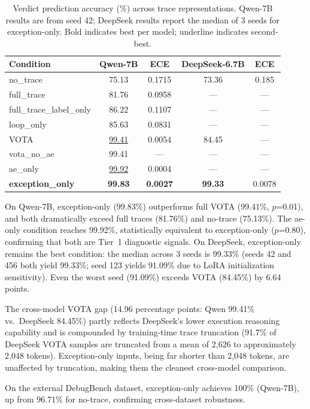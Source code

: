 \documentclass[11pt]{article}
\begin{document}
\begin{table}[t]
\centering
\caption{Verdict prediction accuracy (\%) across trace representations. Qwen-7B results are from seed 42; DeepSeek results report the median of 3 seeds for exception-only. Bold indicates best per model; underline indicates second-best.}
\label{tab:main}
\small
\begin{tabular}{lcccc}
\toprule
\textbf{Condition} & \textbf{Qwen-7B} & \textbf{ECE} & \textbf{DeepSeek-6.7B} & \textbf{ECE} \\
\midrule
no\_trace & 75.13 & 0.1715 & 73.36 & 0.185 \\
full\_trace & 81.76 & 0.0958 & --- & --- \\
full\_trace\_label\_only & 86.22 & 0.1107 & --- & --- \\
loop\_only & 85.63 & 0.0831 & --- & --- \\
VOTA & \underline{99.41} & 0.0054 & 84.45 & --- \\
vota\_no\_ae & 99.41 & --- & --- & --- \\
ae\_only & \underline{99.92} & 0.0004 & --- & --- \\
\textbf{exception\_only} & \textbf{99.83} & \textbf{0.0027} & \textbf{99.33} & 0.0078 \\
\bottomrule
\end{tabular}
\end{table}

On Qwen-7B, exception-only (99.83\%) outperforms full VOTA (99.41\%, $p$=0.01), and both dramatically exceed full traces (81.76\%) and no-trace (75.13\%). The ae-only condition reaches 99.92\%, statistically equivalent to exception-only ($p$=0.80), confirming that both are Tier~1 diagnostic signals. On DeepSeek, exception-only remains the best condition: the median across 3 seeds is 99.33\% (seeds 42 and 456 both yield 99.33\%; seed 123 yields 91.09\% due to LoRA initialization sensitivity). Even the worst seed (91.09\%) exceeds VOTA (84.45\%) by 6.64 points.

The cross-model VOTA gap (14.96 percentage points: Qwen 99.41\% vs.\ DeepSeek 84.45\%) partly reflects DeepSeek's lower execution reasoning capability and is compounded by training-time trace truncation (91.7\% of DeepSeek VOTA samples are truncated from a mean of 2,626 to approximately 2,048 tokens). Exception-only inputs, being far shorter than 2,048 tokens, are unaffected by truncation, making them the cleanest cross-model comparison.

On the external DebugBench dataset, exception-only achieves 100\% (Qwen-7B), up from 96.71\% for no-trace, confirming cross-dataset robustness.
\end{document}

